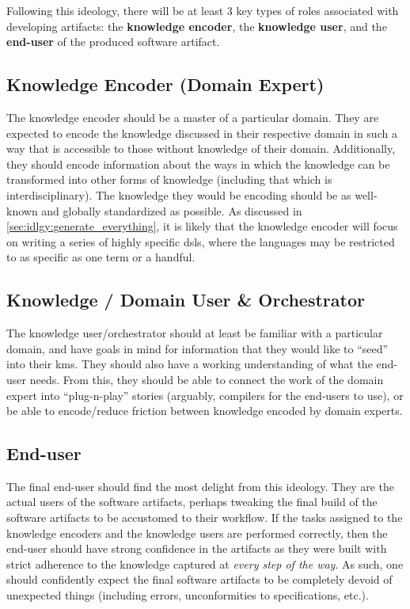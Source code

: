 Following this ideology, there will be at least 3 key types of roles associated
with developing artifacts: the \textbf{knowledge encoder}, the \textbf{knowledge
    user}, and the \textbf{end-user} of the produced software artifact.

\subsection{Knowledge Encoder (Domain Expert)}

The knowledge encoder should be a master of a particular domain. They are
expected to encode the knowledge discussed in their respective domain in such a
way that is accessible to those without knowledge of their domain. Additionally,
they should encode information about the ways in which the knowledge can be
transformed into other forms of knowledge (including that which is
interdisciplinary). The knowledge they would be encoding should be as well-known
and globally standardized as possible. As discussed in
\autoref{sec:idlgy:generate_everything}, it is likely that the knowledge encoder
will focus on writing a series of highly specific \aclp{dsl}, where the
languages may be restricted to as specific as one term or a handful.

\subsection{Knowledge / Domain User \& Orchestrator}

The knowledge user/orchestrator should at least be familiar with a particular
domain, and have goals in mind for information that they would like to ``seed''
into their \acl{kms}. They should also have a working understanding of what the
end-user needs. From this, they should be able to connect the work of the domain
expert into ``plug-n-play'' stories (arguably, compilers for the end-users to
use), or be able to encode/reduce friction between knowledge encoded by domain
experts.

\subsection{End-user}

The final end-user should find the most delight from this ideology. They are the
actual users of the software artifacts, perhaps tweaking the final build of the
software artifacts to be accustomed to their workflow. If the tasks assigned to
the knowledge encoders and the knowledge users are performed correctly, then the
end-user should have strong confidence in the artifacts as they were built with
strict adherence to the knowledge captured at \textit{every step of the way}. As
such, one should confidently expect the final software artifacts to be
completely devoid of unexpected things (including errors, unconformities to
specifications, etc.).

